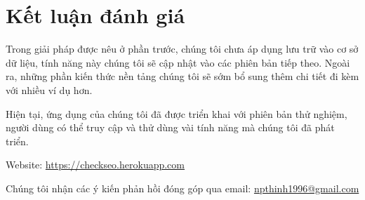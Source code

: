 \chapter{Kết luận đánh giá}
Trong giải pháp được nêu ở phần trước, chúng tôi chưa áp dụng lưu trữ vào cơ sở dữ liệu, tính năng này chúng tôi sẽ cập nhật vào các phiên bản tiếp theo. Ngoài ra, những phần kiến thức nền tảng chúng tôi sẽ sớm bổ sung thêm chi tiết đi kèm với nhiều ví dụ hơn.
\par
Hiện tại, ứng dụng của chúng tôi đã được triển khai với phiên bản thử nghiệm, người dùng có thể truy cập và thử dùng vài tính năng mà chúng tôi đã phát triển.
\par
Website: \url{https://checkseo.herokuapp.com}
\par
Chúng tôi nhận các ý kiến phản hồi đóng góp qua email: \href{mailto:npthinh1996@gmail.com}{npthinh1996@gmail.com}